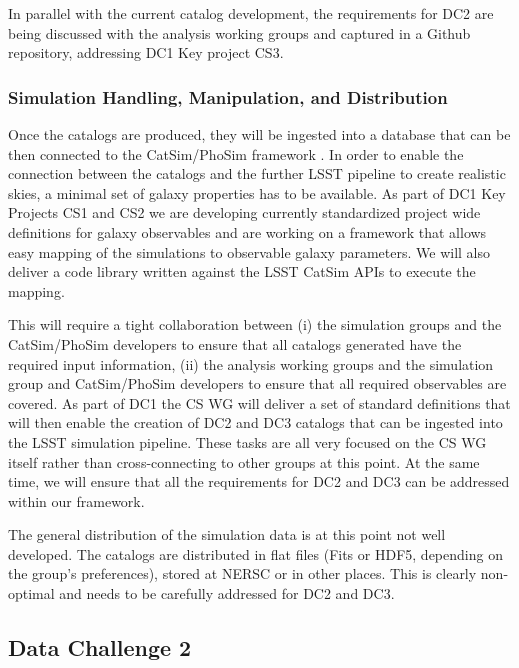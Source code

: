 In parallel with the current catalog development, the requirements for DC2 are being discussed with the analysis working groups and captured in a Github repository, addressing DC1 Key project CS3. 

\subsubsection{Simulation Handling, Manipulation, and Distribution}
\label{sec:keysims:dc1:handling}

Once the catalogs are produced, they will be ingested into a database that can be then connected to the CatSim/PhoSim framework . In order to enable the connection between the catalogs and the further LSST pipeline to create realistic skies, a minimal set of galaxy properties has to be available. As part of DC1 Key Projects CS1 and CS2 we are developing currently standardized project wide definitions for galaxy observables and are working on a framework that allows easy mapping of the simulations to observable galaxy parameters. We will also deliver a code library written against the LSST CatSim APIs to execute the mapping.

This will require a tight collaboration between (i) the simulation groups and the CatSim/PhoSim developers to ensure that all catalogs generated have the required input information, (ii) the analysis working groups and the simulation group and CatSim/PhoSim developers to ensure that all required observables are covered. As part of DC1 the CS WG will deliver a set of standard definitions that will then enable the creation of DC2 and DC3 catalogs that can be ingested into the LSST simulation pipeline. These tasks are all very focused on the CS WG itself rather than cross-connecting to other groups at this point. At the same time, we will ensure that all the requirements for DC2 and DC3 can be addressed within our framework.

The general distribution of the simulation data is at this point not well developed. The catalogs are distributed in flat files (Fits or HDF5, depending on the group's preferences), stored at NERSC or in other places. This is clearly non-optimal and needs to be carefully addressed for DC2 and DC3.

\subsection{Data Challenge 2}
\label{sec:keysims:dc2}

